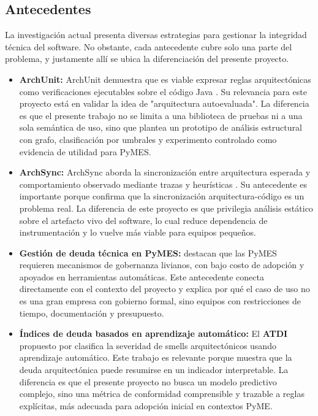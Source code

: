\subsection{Antecedentes}
La investigación actual presenta diversas estrategias para gestionar la integridad técnica del software. No obstante, cada antecedente cubre solo una parte del problema, y justamente allí se ubica la diferenciación del presente proyecto.
\begin{itemize}
    \item \textbf{ArchUnit:} ArchUnit demuestra que es viable expresar reglas arquitectónicas como verificaciones ejecutables sobre el código Java \parencite{ArchUnit}. Su relevancia para este proyecto está en validar la idea de "arquitectura autoevaluada". La diferencia es que el presente trabajo no se limita a una biblioteca de pruebas ni a una sola semántica de uso, sino que plantea un prototipo de análisis estructural con grafo, clasificación por umbrales y experimento controlado como evidencia de utilidad para PyMES.

    \item \textbf{ArchSync:} ArchSync aborda la sincronización entre arquitectura esperada y comportamiento observado mediante trazas y heurísticas \parencite{ArchSyncJAndres}. Su antecedente es importante porque confirma que la sincronización arquitectura-código es un problema real. La diferencia de este proyecto es que privilegia análisis estático sobre el artefacto vivo del software, lo cual reduce dependencia de instrumentación y lo vuelve más viable para equipos pequeños.

    \item \textbf{Gestión de deuda técnica en PyMES:} \textcite{Hamed2023} destacan que las PyMES requieren mecanismos de gobernanza livianos, con bajo costo de adopción y apoyados en herramientas automáticas. Este antecedente conecta directamente con el contexto del proyecto y explica por qué el caso de uso no es una gran empresa con gobierno formal, sino equipos con restricciones de tiempo, documentación y presupuesto.

    \item \textbf{Índices de deuda basados en aprendizaje automático:} El \textbf{ATDI} propuesto por \textcite{SasAvgeriou} clasifica la severidad de smells arquitectónicos usando aprendizaje automático. Este trabajo es relevante porque muestra que la deuda arquitectónica puede resumirse en un indicador interpretable. La diferencia es que el presente proyecto no busca un modelo predictivo complejo, sino una métrica de conformidad comprensible y trazable a reglas explícitas, más adecuada para adopción inicial en contextos PyME.


\end{itemize}
